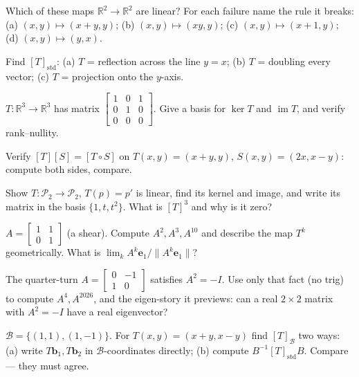 \begin{exercise}[easy]
Which of these maps $\mathbb{R}^2\to\mathbb{R}^2$ are linear? For each failure name the rule it breaks: (a) $(x,y)\mapsto(x+y,y)$; (b) $(x,y)\mapsto(xy,y)$; (c) $(x,y)\mapsto(x+1,y)$; (d) $(x,y)\mapsto(y,x)$.
\end{exercise}
\begin{exercise}[easy]
Find $[T]_{\text{std}}$: (a) $T$ = reflection across the line $y=x$; (b) $T$ = doubling every vector; (c) $T$ = projection onto the $y$-axis.
\end{exercise}
\begin{exercise}[easy]
$T:\mathbb{R}^3\to\mathbb{R}^3$ has matrix $\begin{bmatrix}1&0&1\\0&1&0\\0&0&0\end{bmatrix}$. Give a basis for $\ker T$ and $\operatorname{im}T$, and verify rank--nullity.
\end{exercise}
\begin{exercise}[easy]
Verify $[T][S]=[T\circ S]$ on $T(x,y)=(x+y,y)$, $S(x,y)=(2x,x-y)$: compute both sides, compare.
\end{exercise}
\begin{exercise}[medium]
Show $T:\mathcal{P}_2\to\mathcal{P}_2$, $T(p)=p'$ is linear, find its kernel and image, and write its matrix in the basis $\{1,t,t^2\}$. What is $[T]^3$ and why is it zero?
\end{exercise}
\begin{exercise}[medium]
$A=\begin{bmatrix}1&1\\0&1\end{bmatrix}$ (a shear). Compute $A^2,A^3,A^{10}$ and describe the map $T^k$ geometrically. What is $\lim_k A^k\mathbf e_1/\|A^k\mathbf e_1\|$?
\end{exercise}
\begin{exercise}[medium]
The quarter-turn $A=\begin{bmatrix}0&-1\\1&0\end{bmatrix}$ satisfies $A^2=-I$. Use only that fact (no trig) to compute $A^4, A^{2026}$, and the eigen-story it previews: can a real $2\times2$ matrix with $A^2=-I$ have a real eigenvector?
\end{exercise}
\begin{exercise}
$\mathcal B=\{(1,1),(1,-1)\}$. For $T(x,y)=(x+y,x-y)$ find $[T]_{\mathcal B}$ two ways: (a) write $T\mathbf b_1,T\mathbf b_2$ in $\mathcal B$-coordinates directly; (b) compute $B^{-1}[T]_{\mathrm{std}}B$. Compare — they must agree.
\end{exercise}
